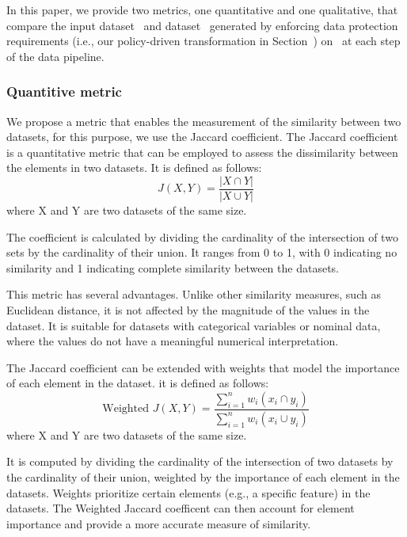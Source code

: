 In this paper, we provide two metrics, one quantitative and one qualitative, that compare the input dataset \origdataset\ and dataset \transdataset\ generated by enforcing data protection requirements (i.e., our policy-driven transformation in Section~\cite{ADD}) on \origdataset\ at each step of the data pipeline.

\subsubsection{Quantitive metric}
We propose a metric that enables the measurement of the similarity between two datasets, for this purpose, we use the Jaccard coefficient.
The Jaccard coefficient is a quantitative metric that can be employed to assess the dissimilarity between the elements in two datasets.
It is defined as follows:\[J(X,Y) = \frac{|X \cap Y|}{|X \cup Y|}\]
where X and Y are two datasets of the same size.

The coefficient is calculated by dividing the cardinality of the intersection of two sets by the cardinality of their union. It ranges from 0 to 1, with 0 indicating no similarity and 1 indicating complete similarity between the datasets.

This metric has several advantages. Unlike other similarity measures, such as Euclidean distance, it is not affected by the magnitude of the values in the dataset. It is suitable for datasets with categorical variables or nominal data, where the values do not have a meaningful numerical interpretation.

The Jaccard coefficient can be extended with weights that model the importance of each element in the dataset.
it is defined as follows:\[\text{Weighted }J(X,Y) = \frac{\sum_{i=1}^{n}w_i(x_i \cap y_i)}{\sum_{i=1}^{n}w_i(x_i \cup y_i)}\]
where X and Y are two datasets of the same size.

It is computed by dividing the cardinality of the intersection of two datasets by the cardinality of their union, weighted by the importance of each element in the datasets. Weights prioritize certain elements (e.g., a specific feature) in the datasets.
The Weighted Jaccard coefficent can then account for element importance and provide a more accurate measure of similarity.

